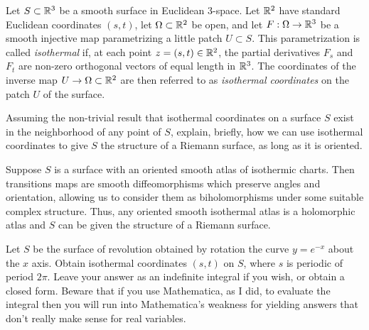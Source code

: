 \documentclass[expanded]{lkx_pset}
\begin{document}
\begin{problem}{4}
Let $S\subset \mathbb{R}^{3}$ be a smooth surface in Euclidean 3-space.
Let $\mathbb{R}^{2}$ have standard Euclidean coordinates $(s,t)$, let
$\Omega\subset \mathbb{R}^{2}$ be open, and let $F:\Omega\to \mathbb{R}^{3}$ be a
smooth injective map parametrizing a little patch $U \subset S$. This
parametrization is called \emph{isothermal} if, at each point $z =(s,t) \in \mathbb{R}^{2}$,
the partial derivatives $F_{s}$ and $F_{t}$ are non-zero orthogonal
vectors of equal length in $\mathbb{R}^{3}$. The coordinates of the inverse map $U\to
	\Omega\subset \mathbb{R}^{2}$ are then referred to as \emph{isothermal coordinates} on the patch $U$ of the surface.
\end{problem}

\begin{parts}
	\begin{part}{}
		Assuming the non-trivial
		result that isothermal coordinates on a surface $S$ exist in the
		neighborhood of any point of $S$, explain, briefly, how we
		can use isothermal coordinates to give $S$ the structure of a Riemann
		surface, as long as it is oriented.
	\end{part}

	Suppose $S$ is a surface with an oriented smooth atlas of isothermic charts. Then transitions maps are smooth diffeomorphisms which preserve angles and orientation, allowing us to consider them as biholomorphisms under some suitable complex structure. Thus, any oriented smooth isothermal atlas is a holomorphic atlas and $S$ can be given the structure of a Riemann surface.

	\begin{part}{}
		Let $S$ be the surface of revolution obtained by rotation the curve
		$y=e^{-x}$ about the $x$ axis. Obtain isothermal
		coordinates $(s,t)$ on $S$, where $s$ is periodic of period $2\pi$.
		Leave your answer as an indefinite integral if you wish, or obtain a
		closed form. Beware that if you use Mathematica, as I did, to evaluate
		the integral then you will run into Mathematica's weakness for
		yielding answers that don't really make sense for real variables.
	\end{part}


\end{parts}
\end{document}
